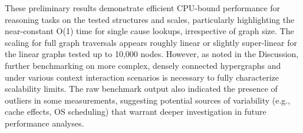 These preliminary results demonstrate efficient CPU-bound performance for reasoning tasks on the tested structures and scales, particularly highlighting the near-constant O(1) time for single cause lookups, irrespective of graph size. The scaling for full graph traversals appears roughly linear or slightly super-linear for the linear graphs tested up to 10,000 nodes. However, as noted in the Discussion, further benchmarking on more complex, densely connected hypergraphs and under various context interaction scenarios is necessary to fully characterize scalability limits. The raw benchmark output also indicated the presence of outliers in some measurements, suggesting potential sources of variability (e.g., cache effects, OS scheduling) that warrant deeper investigation in future performance analyses.
